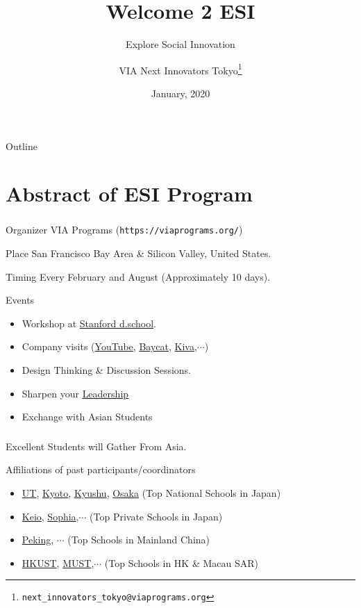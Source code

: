 \documentclass[dvipdfmx,10pt]{beamer}
\title{Welcome 2 ESI}
\subtitle{Explore Social Innovation}
\author[VIA Next Innovators Tokyo]{VIA Next Innovators Tokyo\footnote{\texttt{next\_innovators\_tokyo@viaprograms.org}}}
\institute{Authorized Affiliate of \href{https://viaprograms.org/}{VIA Programs}}
\date[Jan., 2020]{January, 2020}
\newcommand{\bb}{\begin{block}}
\newcommand{\eb}{\end{block}}
\newcommand{\ft}{\frametitle}
\begin{document}
\begin{frame}
\titlepage
\end{frame}
\begin{frame}{Outline}
  \setcounter{tocdepth}{3}
  \tableofcontents[
    sectionstyle=show,
    subsectionstyle=show/show,
    subsubsectionstyle=show/show/show
    ]
\end{frame}
\section{Abstract of ESI Program}
\begin{frame}\ft{\insertsection}
\footnotesize
\bb{Organizer}
VIA Programs (\texttt{https://viaprograms.org/})
\eb
\bb{Place}
San Francisco Bay Area \& Silicon Valley, United States.
\eb
\bb{Timing}
Every February and August (Approximately 10 days).
\eb
\bb{Events}
\begin{itemize}
\item Workshop at \href{https://dschool.stanford.edu/}{Stanford d.school}.
\item Company visits (\href{https://en.wikipedia.org/wiki/YouTube
}{YouTube}, \href{https://www.baycat.org/}{Baycat}, \href{https://www.kiva.org/}{Kiva},$\cdots$)
\item Design Thinking \& Discussion Sessions.
\item Sharpen your \href{https://en.wikipedia.org/wiki/Leadership}{Leadership}
\item Exchange with Asian Students
\end{itemize}
\eb
\normalsize
\end{frame}
\begin{frame}\ft{\insertsection}
Excellent Students will Gather From Asia.
\begin{exampleblock}{Affiliations of past participants/coordinators}
\begin{itemize}
\item \href{https://www.u-tokyo.ac.jp/en/}{UT}, \href{https://www.kyoto-u.ac.jp/en/}{Kyoto}, \href{http://www.kyushu-u.ac.jp/en/}{Kyushu}, \href{https://www.osaka-u.ac.jp/en}{Osaka} (Top National Schools in Japan)
\item \href{https://www.keio.ac.jp/en/}{Keio}, \href{https://www.sophia.ac.jp/eng/}{Sophia},$\cdots$ (Top Private Schools in Japan)
\item \href{http://english.pku.edu.cn/}{Peking}, $\cdots$ (Top Schools in Mainland China)
\item \href{https://www.ust.hk/}{HKUST}, \href{https://www.must.edu.mo/en}{MUST},$\cdots$ (Top Schools in HK \& Macau SAR)
\end{itemize}
\end{exampleblock}
\end{frame}
\end{document}
